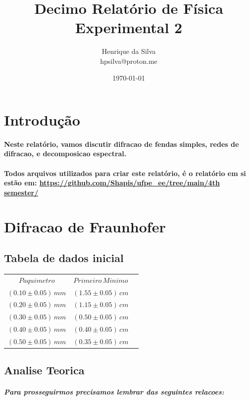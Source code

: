 \documentclass[12pt,twoside, a4paper, twocolumn]{article}
\title{Decimo  Relatório de Física Experimental 2}
\author{Henrique da Silva \\ hpsilva@proton.me}
\date{\today}
\begin{document}
\maketitle
{}
\newpage
\tableofcontents
\newpage

\section{Introdução}

\paragraph*{Neste relatório, vamos discutir difracao de fendas simples, redes de difracao, e decomposicao espectral.}

\paragraph*{Todos arquivos utilizados para criar este relatório, é o relatório em si estão em:  \url{https://github.com/Shapis/ufpe_ee/tree/main/4th semester/}}


\section{Difracao de Fraunhofer}


\subsection{Tabela de dados inicial}

\begin{center}
  \begin{tabular}{ |c|c|c| }
    \hline
    $Paquimetro$          & $Primeiro\,Minimo$    \\
    $(0.10 \pm 0.05)\,mm$ & $(1.55 \pm 0.05)\,cm$ \\
    $(0.20 \pm 0.05)\,mm$ & $(1.15 \pm 0.05)\,cm$ \\
    $(0.30 \pm 0.05)\,mm$ & $(0.50 \pm 0.05)\,cm$ \\
    $(0.40 \pm 0.05)\,mm$ & $(0.40 \pm 0.05)\,cm$ \\
    $(0.50 \pm 0.05)\,mm$ & $(0.35 \pm 0.05)\,cm$ \\
    \hline
  \end{tabular}
\end{center}

\pagebreak
\subsection{Analise Teorica}
\subparagraph*{Para prosseguirmos precisamos lembrar das seguintes relacoes:}
\end{document}

